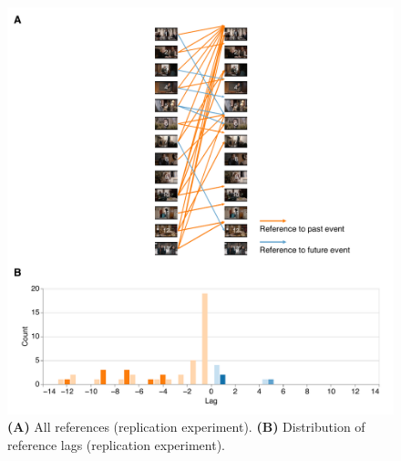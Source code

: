 \documentclass[10pt]{article}
\begin{document}
\begin{figure}[tp]
    \centering
    \includegraphics[width=\textwidth]{supp3_rep}
    \caption{\textbf{(A)} All references (replication experiment). \textbf{(B)} Distribution of reference lags (replication experiment).}
    \label{fig:supp3_rep}
\end{figure}
\end{document}
